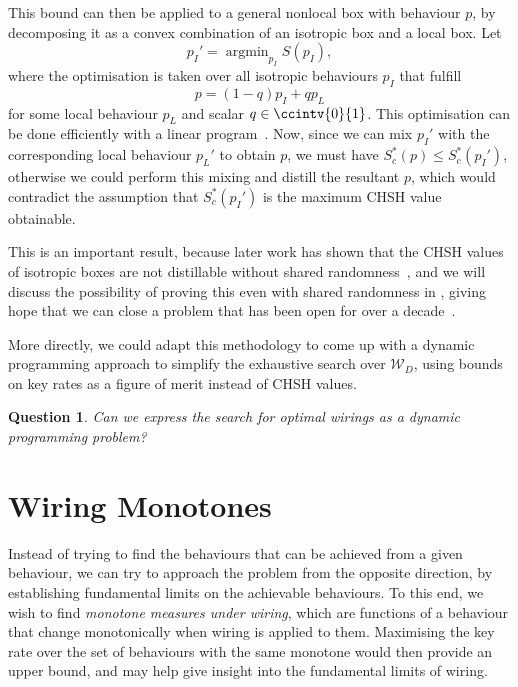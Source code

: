 \documentclass[10pt, a4paper]{article}
\numberwithin{equation}{section} %
\theoremstyle{definition}
\theoremstyle{plain}
\newtheorem{question}{Question}
\DeclareMathOperator*{\argmin}{argmin}
\newcommand{\?}{\mathrel{?}} %
\newcommand{\sW}{\mathcal{W}}
\begin{document}
                    This bound can then be applied to a general nonlocal box with behaviour \(p\), by decomposing it as a convex combination of an isotropic box and a local box. Let
                    \[ p_I' = \argmin_{p_I} S(p_I), \]
                    where the optimisation is taken over all isotropic behaviours \(p_I\) that fulfill
                    \[ p = (1-q)p_I + qp_L \]
                    for some local behaviour \(p_L\) and scalar \(q \in\ccintv{0}{1}\). This optimisation can be done efficiently with a linear program~\cite{LocalPartLP}. Now, since we can mix \(p_I'\) with the corresponding local behaviour \(p_L'\) to obtain \(p\), we must have \(S^*_c(p) \leq S^*_c(p_I')\), otherwise we could perform this mixing and distill the resultant \(p\), which would contradict the assumption that \(S^*_c(p_I')\) is the maximum CHSH value obtainable.

                    This is an important result, because later work has shown that the CHSH values of isotropic boxes are not distillable without shared randomness~\cite{NLMonotones}, and we will discuss the possibility of proving this even with shared randomness in , giving hope that we can close a problem that has been open for over a decade~\cite{NLLimits, DistillationBounds}.

                    More directly, we could adapt this methodology to come up with a dynamic programming approach to simplify the exhaustive search over \(\sW_D\), using bounds on key rates as a figure of merit instead of CHSH values.
                  \begin{question}
                    Can we express the search for optimal wirings as a dynamic programming problem?
                  \end{question}

                  \section{Wiring Monotones}\label{sec:wirmono}

                  Instead of trying to find the behaviours that can be achieved from a given behaviour, we can try to approach the problem from the opposite direction, by establishing fundamental limits on the achievable behaviours. To this end, we wish to find \emph{monotone measures under wiring}, which are functions of a behaviour that change monotonically when wiring is applied to them. Maximising the key rate over the set of behaviours with the same monotone would then provide an upper bound, and may help give insight into the fundamental limits of wiring.
\end{document}
